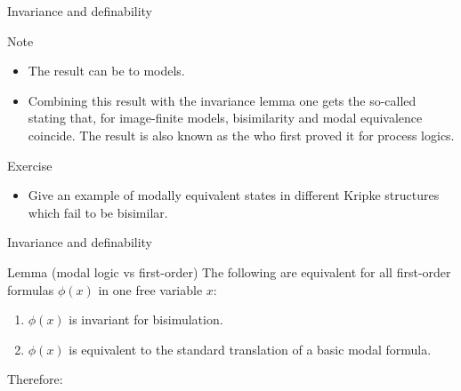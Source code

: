 \documentclass{beamer}
\begin{document}
\begin{slide}{Invariance and definability}\label{s:34}
\small
\begin{block}{Note}
\begin{itemize}
\item The result can be  to  models.
\item Combining this result with the invariance lemma one gets the so-called  stating that, for image-finite models, bisimilarity and modal equivalence coincide. The result is also known as the  who first proved it for process logics.
\end{itemize}
\end{block}

\begin{exampleblock}{Exercise}
\begin{itemize}
\item Give an example of modally equivalent states in different Kripke structures which fail to be bisimilar.
\end{itemize}
\end{exampleblock}
\end{slide}


\begin{slide}{Invariance and definability}\label{s:35}
\small

\begin{block}{Lemma (modal logic vs first-order)}
The following are equivalent for all first-order formulas $\phi(x)$ in one free variable $x$:
\begin{enumerate}
\item $\phi(x)$ is invariant for bisimulation.
\item $\phi(x)$ is equivalent to the standard translation of a basic modal formula.
 \end{enumerate}
  \end{block}
  
 Therefore:\\
\end{slide}
\end{document}
